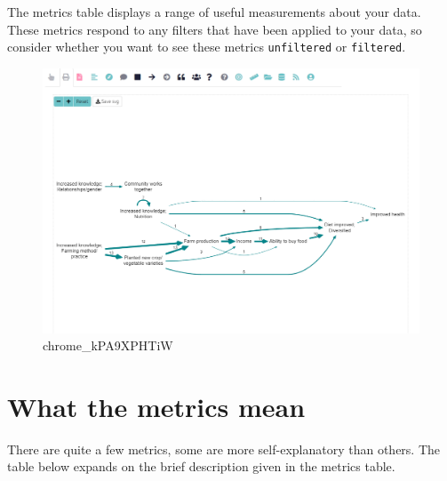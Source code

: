 \documentclass[
]{book}
\begin{document}
The metrics table displays a range of useful measurements about your data. These metrics respond to any filters that have been applied to your data, so consider whether you want to see these metrics \texttt{unfiltered} or \texttt{filtered}.

\begin{figure}
\centering
\includegraphics[width=6.77083in,height=\textheight]{_assets/chrome_kPA9XPHTiW.gif}
\caption{chrome\_kPA9XPHTiW}
\end{figure}

\hypertarget{what-the-metrics-mean}{%
\section{What the metrics mean}\label{what-the-metrics-mean}}

There are quite a few metrics, some are more self-explanatory than others. The table below expands on the brief description given in the metrics table.
\end{document}
